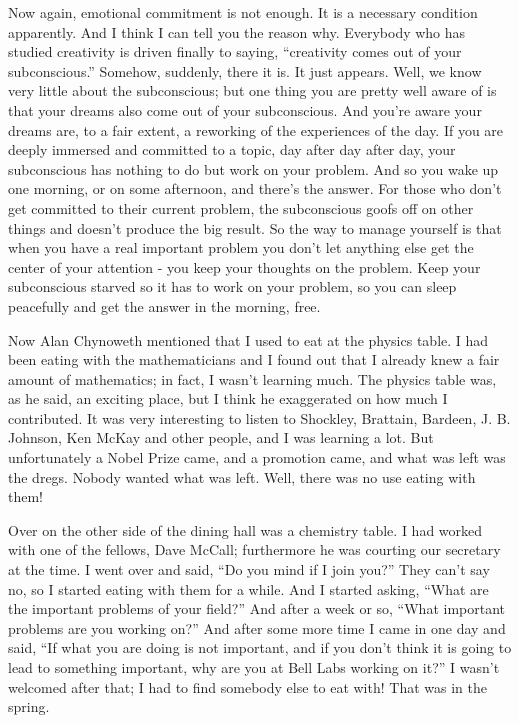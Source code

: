 \documentclass{article}
\begin{document}
Now again, emotional commitment is not enough. It is a necessary condition apparently. And I think I can tell you the reason why. Everybody who has studied creativity is driven finally to saying, ``creativity comes out of your subconscious.'' Somehow, suddenly, there it is. It just appears. Well, we know very little about the subconscious; but one thing you are pretty well aware of is that your dreams also come out of your subconscious. And you're aware your dreams are, to a fair extent, a reworking of the experiences of the day. If you are deeply immersed and committed to a topic, day after day after day, your subconscious has nothing to do but work on your problem. And so you wake up one morning, or on some afternoon, and there's the answer. For those who don't get committed to their current problem, the subconscious goofs off on other things and doesn't produce the big result. So the way to manage yourself is that when you have a real important problem you don't let anything else get the center of your attention - you keep your thoughts on the problem. Keep your subconscious starved so it has to work on your problem, so you can sleep peacefully and get the answer in the morning, free.

Now Alan Chynoweth mentioned that I used to eat at the physics table. I had been eating with the mathematicians and I found out that I already knew a fair amount of mathematics; in fact, I wasn't learning much. The physics table was, as he said, an exciting place, but I think he exaggerated on how much I contributed. It was very interesting to listen to Shockley, Brattain, Bardeen, J. B. Johnson, Ken McKay and other people, and I was learning a lot. But unfortunately a Nobel Prize came, and a promotion came, and what was left was the dregs. Nobody wanted what was left. Well, there was no use eating with them!

Over on the other side of the dining hall was a chemistry table. I had worked with one of the fellows, Dave McCall; furthermore he was courting our secretary at the time. I went over and said, ``Do you mind if I join you?'' They can't say no, so I started eating with them for a while. And I started asking, ``What are the important problems of your field?'' And after a week or so, ``What important problems are you working on?'' And after some more time I came in one day and said, ``If what you are doing is not important, and if you don't think it is going to lead to something important, why are you at Bell Labs working on it?'' I wasn't welcomed after that; I had to find somebody else to eat with! That was in the spring.
\end{document}
